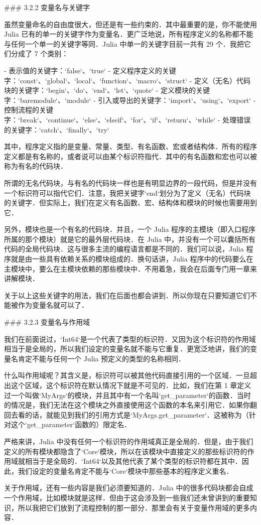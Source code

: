 ### 3.2.2 变量名与关键字

虽然变量命名的自由度很大，但还是有一些约束的．其中最重要的是，你不能使用 Julia 已有的单一的关键字作为变量名．更广泛地说，所有程序定义的名称都不能与任何一个单一的关键字等同．Julia 中单一的关键字目前一共有 29 个．我把它们分成了 7 个类别：

- 表示值的关键字：`false`、`true`
- 定义程序定义的关键字：`const`、`global`、`local`、`function`、`macro`、`struct`
- 定义（无名）代码块的关键字：`begin`、`do`、`end`、`let`、`quote`
- 定义模块的关键字：`baremodule`、`module`
- 引入或导出的关键字：`import`、`using`、`export`
- 控制流程的关键字：`break`、`continue`、`else`、`elseif`、`for`、`if`、`return`、`while`
- 处理错误的关键字：`catch`、`finally`、`try`

其中，程序定义指的是变量、常量、类型、有名函数、宏或者结构体．所有的程序定义都是有名称的，或者说可以由某个标识符指代．其中的有名函数和宏也可以被称为有名的代码块．

所谓的无名代码块，与有名的代码块一样也是有明显边界的一段代码，但是并没有一个标识符可以指代它们．注意，我把关键字`end`划分为了定义（无名）代码块的关键字．但实际上，我们在定义有名函数、宏、结构体和模块的时候也需要用到它．

另外，模块也是一个有名的代码块．并且，一个 Julia 程序的主模块（即入口程序所属的那个模块）就是它的最外层代码块．在 Julia 中，并没有一个可以囊括所有代码的全局代码块．这与很多主流的编程语言都是不同的．我们可以说，Julia 程序就是由一些具有依赖关系的模块组成的．换句话讲，Julia 程序中的代码要么在主模块中，要么在主模块依赖的那些模块中．不用着急，我会在后面专门用一章来讲解模块．

关于以上这些关键字的用法，我们在后面也都会讲到．所以你现在只要知道它们不能被作为变量名就可以了．

### 3.2.3 变量名与作用域

我们在前面说过，`Int64`是一个代表了类型的标识符．又因为这个标识符的作用域相当于是全局的，所以我们设定的变量名就不能与它重复．更宽泛地讲，我们的变量名肯定不能与任何一个 Julia 预定义的类型的名称相同．

什么叫作用域呢？其含义是，标识符可以被其他代码直接引用的一个区域．一旦超出这个区域，这个标识符在默认情况下就是不可见的．比如，我们在第 1 章定义过一个叫做`MyArgs`的模块，并且其中有一个名叫`get_parameter`的函数．当时的情况是，我们无法在这个模块之外直接使用这个函数的本名来引用它．如果你翻回去看的话，就能见到我们的引用方式是`MyArgs.get_parameter`．这被称为（针对这个`get_parameter`函数的）限定名．

严格来讲，Julia 中没有任何一个标识符的作用域真正是全局的．但是，由于我们定义的所有模块都隐含了`Core`模块，所以在该模块中直接定义的那些标识符的作用域就相当于是全局的．`Int64`以及其他代表了某个类型的标识符都在其中．因此，我们设定的变量名肯定不能与`Core`模块中那些基本的程序定义重名．

关于作用域，还有一些内容是我们必须要知道的．Julia 中的很多代码块都会自成一个作用域，比如模块就是这样．但由于这会涉及到一些我们还未曾讲到的重要知识，所以我把它们放到了流程控制的那一部分．那里会有关于变量作用域的更多内容．
